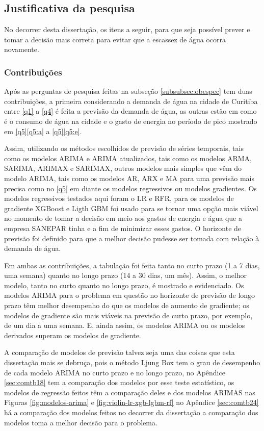 \subsection{Justificativa da pesquisa} \label{subsec:justif}

No decorrer desta dissertação, os itens a seguir, para que seja possível prever e tomar a decisão mais correta para evitar que a escassez de água ocorra novamente.

\subsubsection{Contribui\c c\~oes} \label{subsubsec:Contribuição}

Após as perguntas de pesquisa feitas na subseção \ref{subsubsec:obespec} tem duas contribuições, a primeira considerando a demanda de água na cidade de Curitiba entre \ref{q1} a \ref{q4} é feita a previsão da demanda de água, as outras estão em como é o consumo de água na cidade e o gasto de energia no período de pico mostrado em \ref{q5}\ref{q5:a} a \ref{q5}\ref{q5:e}.

Assim, utilizando os métodos escolhidos de previsão de séries temporais, tais como os modelos ARIMA e ARIMA atualizados, tais como os modelos ARMA, SARIMA, ARIMAX e SARIMAX, outros modelos mais simples que vêm do modelo ARIMA, tais como os modelos AR, ARX e MA para uma previsão mais precisa como no \ref{q5} em diante os modelos regressivos ou modelos gradientes. Os modelos regressivos testados aqui foram o LR e RFR, para os modelos de gradiente XGBoost e Ligth GBM foi usado para se tornar uma opção mais viável no momento de tomar a decisão em meio aos gastos de energia e água que a empresa SANEPAR tinha e a fim de minimizar esses gastos. O horizonte de previsão foi definido para que a melhor decisão pudesse ser tomada com relação à demanda de água.

Em ambas as contribuições, a tabulação foi feita tanto no curto prazo (1 a 7 dias, uma semana) quanto no longo prazo (14 a 30 dias, um mês). Assim, o melhor modelo, tanto no curto quanto no longo prazo, é mostrado e evidenciado. Os modelos ARIMA para o problema em questão no horizonte de previsão de longo prazo têm melhor desempenho do que os modelos de aumento de gradiente; os modelos de gradiente são mais viáveis na previsão de curto prazo, por exemplo, de um dia a uma semana. E, ainda assim, os modelos ARIMA ou os modelos derivados superam os modelos de gradiente.

A comparação de modelos de previsão talvez seja uma das coisas que esta dissertação mais se debruça, pois o método Ljung Box tem o grau de desempenho de cada modelo ARIMA no curto prazo e no longo prazo, no Apêndice \ref{sec:comtb18} tem a comparação dos modelos por esse teste estatístico, os modelos de regressão feitos têm a comparação deles e dos modelos ARIMAS nas Figuras  \ref{fig:modelos-arima} e \ref{fig:violin-lr-xgb-lgbm-rf} no Apêndice \ref{sec:comtb24} há a comparação dos modelos feitos no decorrer da dissertação a comparação dos modelos toma a melhor decisão para o problema.





